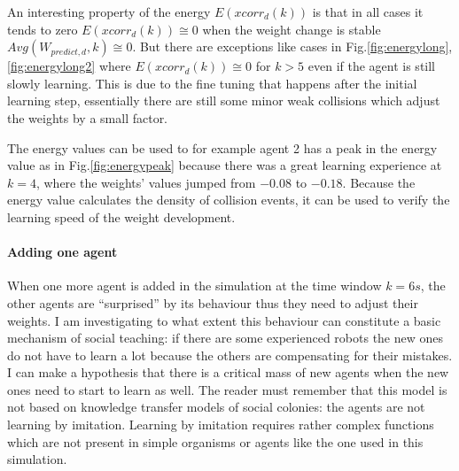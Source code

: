 An interesting property of the energy $E(xcorr_{d}(k))$ is that in all cases it tends
to zero $E(xcorr_{d}(k)) \cong 0$ when the weight change is stable $Avg(W_{predict,d},k) \cong 0$.
But there are exceptions like cases in Fig.\ref{fig:energylong},\ref{fig:energylong2}
where $E(xcorr_{d}(k)) \cong 0$ for $k>5$ even if the agent is still slowly learning.
This is due to the fine tuning that happens after the initial learning step, essentially
there are still some minor weak collisions which adjust the weights by a small factor.

The energy values can be used to for example agent 2 has a peak in the energy value
as in Fig.\ref{fig:energypeak} because there was a great learning experience at $k=4$,
where the weights' values jumped from $-0.08$ to $-0.18$.
Because the energy value calculates the density of collision events, it can be used
to verify the learning speed of the weight development.

\paragraph{Adding one agent}
When one more agent is added in the simulation at the time window $k=6 s$,
the other agents are ``surprised'' by its behaviour thus they need to adjust their weights.
I am investigating to what extent this behaviour can constitute a basic mechanism of social teaching:
if there are some experienced robots the new ones do not have to learn a lot because the others are
compensating for their mistakes.
I can make a hypothesis that there is a critical mass of new agents
when the new ones need to start to learn as well.
The reader must remember that this model is not based on knowledge transfer models of
social colonies: the agents are not learning by imitation.
Learning by imitation requires rather complex functions which are not present in
simple organisms or agents like the one used in this simulation.

